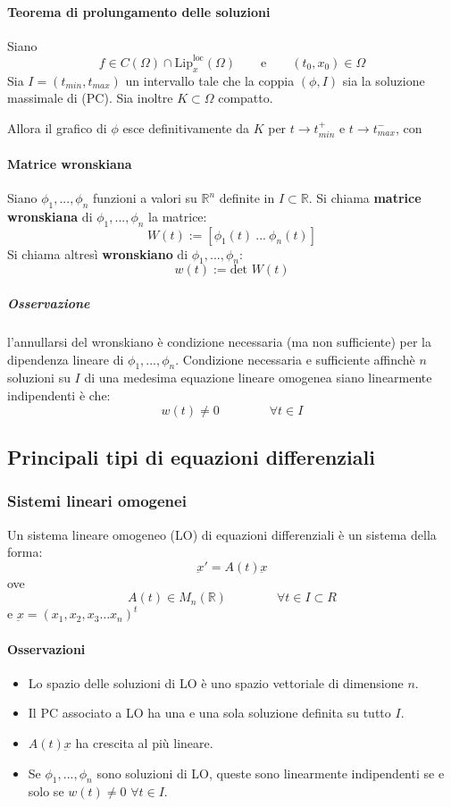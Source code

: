 \documentclass[a4paper,12pt]{article}
\begin{document}
\paragraph{Teorema di prolungamento delle soluzioni}

Siano $$f \in C\left(\Omega\right) \cap \text{Lip}^{\text{loc}}_x\left(\Omega\right)\qquad \text{e} \qquad\left(t_0,x_0\right) \in \Omega$$
Sia $I=(t_{min},t_{max})$ un intervallo tale che la coppia $\left(\phi,I\right)$ sia la soluzione massimale di (PC). Sia inoltre $K\subset \Omega$ compatto.

Allora il grafico di $\phi$ esce definitivamente da $K$ per $t\rightarrow t^+_{min}$ e $t\rightarrow t^-_{max}$, con 

\paragraph{Matrice wronskiana}
Siano $\phi_1,...,\phi_n$ funzioni a valori su $\mathbb{R}^n$ definite in $I\subset \mathbb{R}$.
Si chiama \textbf{matrice wronskiana} di $\phi_1,...,\phi_n$ la matrice:
$$W(t):=[\phi_1(t)\ ...\ \phi_n(t)]$$
Si chiama altresì \textbf{wronskiano} di $\phi_1,...,\phi_n$:
$$w(t):=\text{det } W(t)$$
\subparagraph*{Osservazione} l'annullarsi del wronskiano è condizione necessaria (ma non sufficiente) per la dipendenza lineare di $\phi_1,...,\phi_n$. 
Condizione necessaria e sufficiente affinchè $n$ soluzioni su $I$ di una medesima equazione lineare omogenea siano linearmente indipendenti è che:
$$ w(t)\neq0 \qquad\qquad \forall t \in I$$


\subsection{Principali tipi di equazioni differenziali}
\subsubsection{Sistemi lineari omogenei}
Un sistema lineare omogeneo (LO) di equazioni differenziali è un sistema della forma:
$$\underbar{x}' = A(t)\underbar{x}$$ 
ove $$A(t)\in M_n(\mathbb{R})\qquad \qquad \forall t\in I\subset R$$ e $\underbar{x} = (x_1,x_2,x_3 \dots x_n)^t$
\paragraph{Osservazioni}
\begin{itemize}
 \item Lo spazio delle soluzioni di LO è uno spazio vettoriale di dimensione $n$.
 \item Il PC associato a LO ha una e una sola soluzione definita su tutto $I$.
 \item $A(t)\underbar{x}$ ha crescita al più lineare.
 \item Se $\phi_1,...,\phi_n$ sono soluzioni di LO, queste sono linearmente indipendenti se e solo se $w(t)\neq0$ $\forall t \in I$.
\end{itemize}
\end{document}
